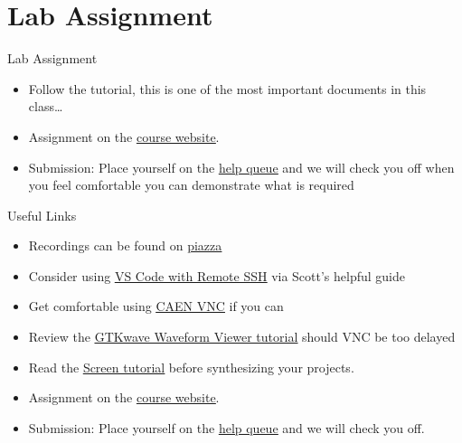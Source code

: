 \documentclass[table,dvipsnames,colorlinks=true]{beamer}
\begin{document}
\section{Lab Assignment}

\begin{frame}{Lab Assignment}
    \begin{itemize}
        \item Follow the tutorial, this is one of the most important documents
            in this class\dots
        \item Assignment on the \href{http://www.eecs.umich.edu/eecs/courses/eecs470}{\underline{course website}}.
        \item Submission: Place yourself on the \href{https://oh.eecs.umich.edu/courses/eecs470}{\underline{help queue}} and we will check you off when you feel comfortable you can demonstrate what is required
    \end{itemize}
\end{frame}

\begin{frame}{Useful Links}
    \begin{itemize}
        \item Recordings can be found on \href{https://piazza.com/class/kjoqguntyr139?cid=7}{\underline{piazza}}
        \item Consider using \href{https://docs.google.com/document/d/1xtkhDykp9vtkyjXg_1e1PFLRxDDjNmuUWUHt-wfaDjU/edit?usp=sharing}{\underline{VS Code with Remote SSH}} via Scott's helpful guide
        \item Get comfortable using \href{https://caenfaq.engin.umich.edu/linux-login/how-do-i-connect-to-a-caen-linux-computer-remotely}{\underline{CAEN VNC}} if you can 
        \item Review the \href{https://docs.google.com/document/d/1U9FOOYAPqvhSQda-v66SCmUgdvuaBs1KIK8Ht4_WSCA/edit?usp=sharing}{\underline{GTKwave Waveform Viewer tutorial}} should VNC be too delayed
        \item Read the  \href{https://docs.google.com/document/d/1mnxgtQkvPcpKlBzCL9bKiwrFYpbx-hsqfRTPK-weB7Q/edit?usp=sharing}{\underline{Screen tutorial}} before synthesizing your projects.
        \item Assignment on the \href{http://www.eecs.umich.edu/eecs/courses/eecs470}{\underline{course website}}.
        \item Submission: Place yourself on the \href{https://oh.eecs.umich.edu/courses/eecs470}{\underline{help queue}} and we will check you off.
    \end{itemize}
\end{frame}

\appendix
\end{document}

